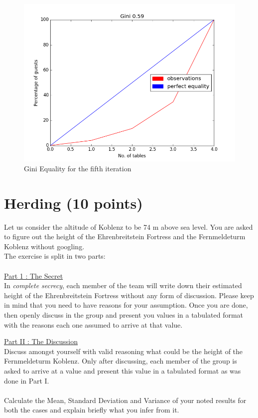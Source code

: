 \documentclass{WeSTassignment}
\begin{document}
\begin{figure}[h]
  \centering
  \includegraphics[scale = 0.5]{gini5.png}
   \caption{Gini Equality for the fifth iteration}
     \label{fig:dig} 
\end{figure}


\section{Herding (10 points)}
Let us consider the altitude of Koblenz to be 74 m above sea level. You are asked to figure out the height of the Ehrenbreitstein Fortress and the Fernmeldeturm Koblenz without googling.\\
The exercise is split in two parts:\\ \\
\underline{Part 1 : The Secret}\\
In \textit{complete secrecy}, each member of the team will write down their estimated height of the Ehrenbreitstein Fortress without any form of discussion. Please keep in mind that you need to have reasons for your assumption. Once you are done, then openly discuss in the group and present you values in a tabulated format with the reasons each one assumed to arrive at that value. 

\underline{Part II : The Discussion}\\
Discuss amongst yourself with valid reasoning  what could be the height of the Fernmeldeturm Koblenz. Only after discussing, each member of the group is asked to arrive at a value and present this value in a tabulated format as was done in Part I. \\ \\
Calculate the Mean, Standard Deviation and Variance of your noted results for both the cases and explain briefly what you infer from it. 
\end{document}
